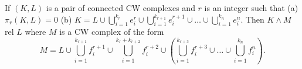If $(K, L)$ is a pair of connected CW complexes and $r$ is an integer such that
(a) $\pi_r(K, L) = 0$
(b) $K = L \cup \bigcup_{i=1}^{k_r} e_i^r \cup \bigcup_{i=1}^{k_{r+1}} e_i^{r+1} \cup \ldots \cup \bigcup_{i=1}^{k_n} e_i^n$.
Then $K \wedge M$ rel $L$ where $M$ is a CW complex of the form
$$M = L \cup \bigcup_{i=1}^{k_{r+1}} f_i^{r+1} \cup \bigcup_{i=1}^{k_r+k_{r+2}} f_i^{r+2} \cup \left( \bigcup_{i=1}^{k_{r+3}} f_i^{r+3} \cup \ldots \cup \bigcup_{i=1}^{k_n} f_i^n \right).$$
